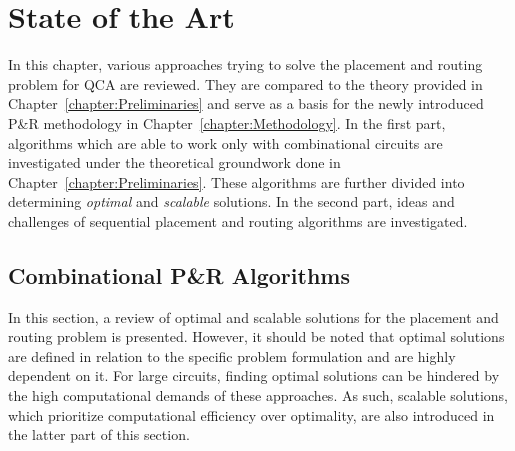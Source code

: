 \chapter{State of the Art}\label{chapter:SotA}
In this chapter, various approaches trying to solve the placement and routing problem for QCA are reviewed. They are compared to the theory provided in Chapter~\ref{chapter:Preliminaries} and serve as a basis for the newly introduced P\&R methodology in Chapter~\ref{chapter:Methodology}. In the first part, algorithms which are able to work only with combinational circuits are investigated under the theoretical groundwork done in Chapter~\ref{chapter:Preliminaries}. These algorithms are further divided into determining \emph{optimal} and \emph{scalable} solutions. In the second part, ideas and challenges of sequential placement and routing algorithms are investigated.

\section{Combinational P\&R Algorithms}
In this section, a review of optimal and scalable solutions for the placement and routing problem is presented. However, it should be noted that optimal solutions are defined in relation to the specific problem formulation and are highly dependent on it. For large circuits, finding optimal solutions can be hindered by the high computational demands of these approaches. As such, scalable solutions, which prioritize computational efficiency over optimality, are also introduced in the latter part of this section.

